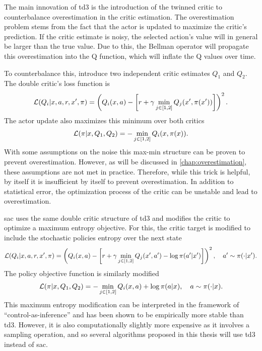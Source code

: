 The main innovation of \ac{td3} is the introduction of the twinned critic to counterbalance overestimation in the critic estimation.
The overestimation problem stems from the fact that the actor is updated to maximize the critic's prediction.
If the critic estimate is noisy, the selected action's value will in general be larger than the true value.
Due to this, the Bellman operator will propagate this overestimation into the Q function, which will inflate the Q values over time.

To counterbalance this, \textcite{fujimoto2018addressing} introduce two independent critic estimates $Q_1$ and $Q_2$.
The double critic's loss function is
\begin{align}
    \mathcal{L}(Q_i| x, a, r, x', \pi) = \left(Q_i(x,a) - \left[r + \gamma \min_{j \in [1,2]}Q_j(x', \pi(x'))\right]\right)^2.
\end{align}
The actor update also maximizes this minimum over both critics
\begin{align}
    \mathcal{L}(\pi| x, Q_1, Q_2) = - \min_{j \in [1,2]} Q_i(x, \pi(x)).
\end{align}
With some assumptions on the noise this max-min structure can be proven to prevent overestimation.
However, as will be discussed in \autoref{chap:overestimation}, these assumptions are not met in practice.
Therefore, while this trick is helpful, by itself it is insufficient by itself to prevent overestimation.
In addition to statistical error, the optimization process of the critic can be unstable and lead to overestimation.

\ac{sac} uses the same double critic structure of \ac{td3} and modifies the critic to optimize a maximum entropy objective.
For this, the critic target is modified to include the stochastic policies entropy over the next state
\begin{align}
    \mathcal{L}(Q_i| x, a, r, x', \pi) = \left(Q_i(x,a) - \left[r + \gamma \min_{j \in [1,2]}Q_j(x', a') - \log \pi(a'|x')\right]\right)^2, \quad a'\sim\pi(\cdot|x').
\end{align}
The policy objective function is similarly modified
\begin{align}
    \mathcal{L}(\pi| x, Q_1, Q_2) = - \min_{j \in [1,2]} Q_i(x, a) + \log \pi(a|x), \quad a\sim\pi(\cdot|x).
\end{align}
This maximum entropy modification can be interpreted in the framework of ``control-as-inference'' \parencite{levine2018reinforcement} and has been shown to be empirically more stable than \ac{td3}.
However, it is also computationally slightly more expensive as it involves a sampling operation, and so several algorithms proposed in this thesis will use \ac{td3} instead of \ac{sac}.

